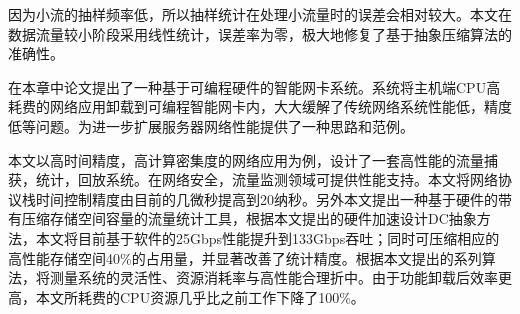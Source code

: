 因为小流的抽样频率低，所以抽样统计在处理小流量时的误差会相对较大。本文在数据流量较小阶段采用线性统计，误差率为零，极大地修复了基于抽象压缩算法的准确性。



在本章中论文提出了一种基于可编程硬件的智能网卡系统。系统将主机端CPU高耗费的网络应用卸载到可编程智能网卡内，大大缓解了传统网络系统性能低，精度低等问题。为进一步扩展服务器网络性能提供了一种思路和范例。

本文以高时间精度，高计算密集度的网络应用为例，设计了一套高性能的流量捕获，统计，回放系统。在网络安全，流量监测领域可提供性能支持。本文将网络协议栈时间控制精度由目前的几微秒提高到20纳秒。另外本文提出一种基于硬件的带有压缩存储空间容量的流量统计工具，根据本文提出的硬件加速设计DC抽象方法，本文将目前基于软件的25Gbps性能提升到133Gbps吞吐；同时可压缩相应的高性能存储空间40\%的占用量，并显著改善了统计精度。根据本文提出的系列算法，将测量系统的灵活性、资源消耗率与高性能合理折中。由于功能卸载后效率更高，本文所耗费的CPU资源几乎比之前工作下降了100\%。















